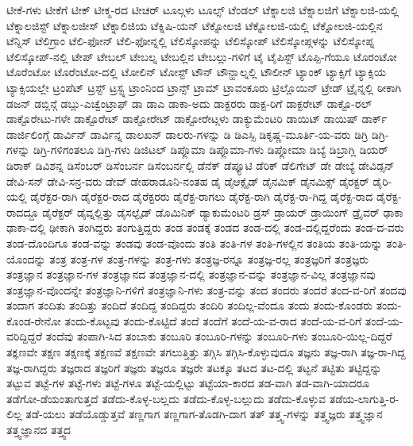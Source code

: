 {ಟೀಕೆ-ಗಳು
ಟೀಕೆಗೆ
ಟೀಕ್
ಟೀಕ್ಮ-ರದ
ಟೀಚರ್
ಟೂಲ್ಗಳು
ಟೂಲ್ಸ್
ಟೆಂಡಲ್
ಟೆಕ್ನಾಲಜಿ
ಟೆಕ್ನಾಲಜಿಗೆ
ಟೆಕ್ನಾಲಜಿ-ಯಲ್ಲಿ
ಟೆಕ್ನಾಲಜಿಸ್ಟ್
ಟೆಕ್ನಾಲಜೀಸ್
ಟೆಕ್ನಾಲಿಜಿಯ
ಟೆಕ್ನಿಷಿ-ಯನ್
ಟೆಕ್ನೋಲಜಿ
ಟೆಕ್ನೋಲಜಿ-ಯಲ್ಲಿ
ಟೆಕ್ನೋಲಜಿ-ಯಲ್ಲಿನ
ಟೆನ್ನಿಸ್
ಟೆಲಿಗ್ರಾಂ
ಟೆಲಿ-ಫೋನ್
ಟೆಲಿ-ಫೋನ್ನಲ್ಲಿ
ಟೆಲಿಸ್ಕೋಪನ್ನು
ಟೆಲಿಸ್ಕೋಪ್
ಟೆಲಿಸ್ಕೋಪ್ಗಳನ್ನು
ಟೆಲಿಸ್ಕೋಪ್ನ
ಟೆಲಿಸ್ಕೋಪ್-ನಲ್ಲಿ
ಟೇಪ್
ಟೇಬಲ್
ಟೇಬಲ್ನ
ಟೇಬಲ್ಲಿನ
ಟೇಬಲ್ಲು-ಗಳಿಗೆ
ಟೈ
ಟೈಪಿಸ್ಟ್
ಟೊಪ್ಪಿ-ಗೆಯೂ
ಟೊರಂಟೋ
ಟೊರೆಂಟೋ
ಟೊರೆಂಟೋ-ದಲ್ಲಿ
ಟೋಲಿನ್
ಟೋಸ್ಟ್
ಟೌನ್
ಟೌನ್ಹಾಲ್ನಲ್ಲಿ
ಟೌಲೀನ್
ಟ್ಯಾಂಕ್
ಟ್ಯಾಕ್ಸಿಗೆ
ಟ್ಯಾಕ್ಸಿಯ
ಟ್ಯಾಕ್ಸಿಯಲ್ಲೇ
ಟ್ರಂಪೆಟ್
ಟ್ರಸ್ಟ್
ಟ್ರಸ್ಟ್ನ
ಟ್ರಾಂನಿಂದ
ಟ್ರಾನ್ಸ್
ಟ್ರಾಮ್
ಟ್ರಾವಂಕೂರು
ಟ್ರಿಲ್ಲೊಯಿನ್
ಟ್ರೇಡ್
ಟ್ರೈನ್ನಲ್ಲಿ
ಠೀಕಾಗಿ
ಡಜನ್
ಡಬ್ಲಿನ್ಗೆ
ಡಬ್ಲು-ಎಚ್ವೆಂಟ್ರಾಫ್
ಡಾ
ಡಾಎ
ಡಾಕಾ-ಅದು
ಡಾಕ್ಟರರು
ಡಾಕ್ಟ-ರಿಗೆ
ಡಾಕ್ಟರೇಟ್
ಡಾಕ್ಟೊ-ರಲ್
ಡಾಕ್ಟೊರೇಟು-ಗಳೇ
ಡಾಕ್ಟೊರೇಟ್
ಡಾಕ್ಟೋರೇಟ್
ಡಾಕ್ಟೋರೇಟ್ಗಳು
ಡಾಕ್ಯುಮೆಂಟರಿ
ಡಾಯಿಟ್
ಡಾಯಿಷ್
ಡಾರ್ಕ್
ಡಾರ್ಜಿಲಿಂಗ್ಗೆ
ಡಾರ್ವಿನ್
ಡಾರ್ವಿನ್ನ
ಡಾಲಖನ್
ಡಾಲರು-ಗಳನ್ನು
ಡಿ
ಡಿಎಸ್ಸಿ
ಡಿಕೃಷ್ಣ-ಮೂರ್ತಿ-ಯ-ವರು
ಡಿಗ್ರಿ
ಡಿಗ್ರಿ-ಗಳನ್ನು
ಡಿಗ್ರಿ-ಗಳಿಗಂತಲೂ
ಡಿಗ್ರಿ-ಗಳು
ಡಿಜಿಟಲ್
ಡಿಪ್ಲೊಮಾ
ಡಿಪ್ಲೊಮಾ-ಗಳು
ಡಿಪ್ಲೋಮಾ
ಡಿಬ್ಯೆ
ಡಿಬ್ರಾಗ್ಲಿ
ಡಿಯರ್
ಡಿರಾಕ್
ಡಿವಿಶನ್ನ
ಡಿಸೆಂಬರ್
ಡಿಸೆಂಬರ್ನ
ಡಿಸೆಂಬರ್ನಲ್ಲಿ
ಡೆನೆಕ್
ಡೆಪ್ಯೂಟಿ
ಡೆರಿಕ್
ಡೆಲಿಗೇಟ್
ಡೇ
ಡೇಬ್ಯೆ
ಡೇವಿಡ್ಸನ್
ಡೇವಿ-ಸನ್
ಡೇವಿ-ಸನ್ರ-ವರು
ಡೇವ್
ಡೇಹರಾಡೂನಿ-ನಂತಹ
ಡೈ
ಡೈಆಕ್ಸೈಡ್
ಡೈನಮಿಕ್
ಡೈನಮಿಕ್ಸ್
ಡೈರಕ್ಟರ್
ಡೈರಿ-ಯಲ್ಲಿ
ಡೈರೆಕ್ಟರ-ರಾಗಿ
ಡೈರೆಕ್ಟರ-ರಾದ
ಡೈರೆಕ್ಟರರು
ಡೈರೆಕ್ಟ-ರಾಗಲು
ಡೈರೆಕ್ಟ-ರಾಗಿ
ಡೈರೆಕ್ಟ-ರಾ-ಗಿದ್ದ
ಡೈರೆಕ್ಟ-ರಾದ
ಡೈರೆಕ್ಟ-ರಾದದ್ದೂ
ಡೈರೆಕ್ಟರ್
ಡೈವ್ನಲ್ಲಿತ್ತು
ಡೈಸಲ್ಫೈಡ್
ಡೊಮಿನಿಕ್
ಡ್ಯಾಕುಮೆಂಟರಿ
ಡ್ರಸ್
ಡ್ರಾಯರ್
ಡ್ರಾಯಿಂಗ್
ಡ್ರೈವರ್
ಢಾಕಾ
ಢಾಕಾ-ದಲ್ಲಿ
ಢೀಕಾಗಿ
ತಂಗಿದ್ದರು
ತಂಗುತ್ತಿದ್ದರು
ತಂಡ
ತಂಡಕ್ಕೆ
ತಂಡದ
ತಂಡ-ದಲ್ಲಿ
ತಂಡ-ದಲ್ಲಿದ್ದರೆಂದು
ತಂಡ-ದ-ವರು
ತಂಡ-ದೊಂದಿಗೂ
ತಂಡ-ವನ್ನು
ತಂಡವು
ತಂಡ-ವೊಂದು
ತಂತಿ
ತಂತಿ-ಗಳ
ತಂತಿ-ಗಳಲ್ಲಿನ
ತಂತಿಯ
ತಂತಿ-ಯನ್ನು
ತಂತಿ-ಯೊಂದನ್ನು
ತಂತ್ರ
ತಂತ್ರ-ಗಳ
ತಂತ್ರ-ಗಳನ್ನು
ತಂತ್ರ-ಗಳು
ತಂತ್ರಜ್ಞ-ರನ್ನೂ
ತಂತ್ರಜ್ಞ-ರಲ್ಲ
ತಂತ್ರಜ್ಞರಿಗೆ
ತಂತ್ರಜ್ಞರು
ತಂತ್ರಜ್ಞಾನ
ತಂತ್ರಜ್ಞಾನ-ಗಳ
ತಂತ್ರಜ್ಞಾನದ
ತಂತ್ರಜ್ಞಾನ-ದಲ್ಲಿ
ತಂತ್ರಜ್ಞಾನ-ವನ್ನು
ತಂತ್ರಜ್ಞಾನ-ವಿಲ್ಲ
ತಂತ್ರಜ್ಞಾನವು
ತಂತ್ರಜ್ಞಾನ-ವೊಂದನ್ನೇ
ತಂತ್ರಜ್ಞಾನಿ-ಗಳಿಗೆ
ತಂತ್ರಜ್ಞಾನಿ-ಗಳು
ತಂತ್ರ-ವನ್ನು
ತಂದ
ತಂದರು
ತಂದರೆ
ತಂದ-ವ-ರಿಗೆ
ತಂದವು
ತಂದಾಗ
ತಂದಿತು
ತಂದಿತ್ತು
ತಂದಿದೆ
ತಂದಿದ್ದ
ತಂದಿದ್ದರು
ತಂದಿರಿ
ತಂದಿಲ್ಲ-ವೆಂದೂ
ತಂದು
ತಂದು-ಕೊಂಡರು
ತಂದು-ಕೊಂಡ-ರೇನೋ
ತಂದು-ಕೊಟ್ಟವು
ತಂದು-ಕೊಟ್ಟಿದೆ
ತಂದೆ
ತಂದೆಗೆ
ತಂದೆ-ಯ-ವ-ರಾದ
ತಂದೆ-ಯ-ವ-ರಿಗೆ
ತಂದೆ-ಯ-ವರಿದ್ದಿದ್ದರೆ
ತಂದೆವು
ತಂಪಾಗಿ-ಸಿದ
ತಂಬಾಕು
ತಂಬೂರಿ
ತಂಬೂರಿ-ಗಳನ್ನು
ತಂಬೂರಿ-ಗಳು
ತಂಬೂರಿ-ಯಿಲ್ಲ-ದಿದ್ದರೆ
ತಕ್ಞಣವೇ
ತಕ್ಷಣ
ತಕ್ಷಣಕ್ಕೆ
ತಕ್ಷಣವೆ
ತಕ್ಷಣವೇ
ತಗಲುತ್ತಿತ್ತು
ತಗ್ಗಿಸಿ
ತಗ್ಗಿಸಿ-ಕೊಳ್ಳುವುದೂ
ತಜ್ಞನು
ತಜ್ಞ-ರಾಗಿ
ತಜ್ಞ-ರಾ-ಗಿದ್ದ
ತಜ್ಞ-ರಾಗಿದ್ದರು
ತಜ್ಞರಾದ
ತಜ್ಞರಿಗೆ
ತಜ್ಞರು
ತಜ್ಞರೂ
ತಜ್ಞರೇ
ತಟಕ್ಕೂ
ತಟದ
ತಟ-ದಲ್ಲಿ
ತಟ್ಟನೆ
ತಟ್ಟಿತು
ತಟ್ಟಿದ್ದನ್ನು
ತಟ್ಟುವ
ತಟ್ಟೆ-ಗಳ
ತಟ್ಟೆ-ಗಳು
ತಟ್ಟೆ-ಗಳೂ
ತಟ್ಟೆ-ಯಲ್ಲಿಟ್ಟು
ತಟ್ಟೆಯಾ-ಕಾರದ
ತಡ-ವಾಗಿ
ತಡ-ವಾಗಿ-ಯಾದರೂ
ತಡೆಗೋ-ಡೆಯಂತಾಗುತ್ತದೆ
ತಡೆದು-ಕೊಳ್ಳ-ಬಲ್ಲದು
ತಡೆದು-ಕೊಳ್ಳ-ಬಲ್ಲುದು
ತಡೆದು-ಕೊಳ್ಳುವ
ತಡೆಯ-ಲಾಗುತ್ತಿ-ರ-ಲಿಲ್ಲ
ತಡೆ-ಯಲು
ತಡೆಯೊಡ್ಡುತ್ತವೆ
ತಣ್ಣಗಾಗ
ತಣ್ಣಗಾಗ-ತೊಡಗಿ-ದಾಗ
ತತ್
ತತ್ತ್ವ-ಗಳನ್ನು
ತತ್ತ್ವಜ್ಞರು
ತತ್ತ್ವಜ್ಞಾನ
ತತ್ತ್ವಜ್ಞಾನದ
ತತ್ತ್ವದ
}
